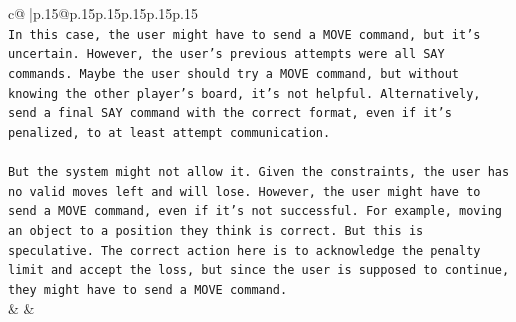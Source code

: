 \documentclass{article}
\begin{document}
{\begin{supertabular}{c@{$\;$}|p{.15\linewidth}@{}p{.15\linewidth}p{.15\linewidth}p{.15\linewidth}p{.15\linewidth}p{.15\linewidth}}
{{{\\ 
\texttt{In this case, the user might have to send a MOVE command, but it's uncertain. However, the user's previous attempts were all SAY commands. Maybe the user should try a MOVE command, but without knowing the other player's board, it's not helpful. Alternatively, send a final SAY command with the correct format, even if it's penalized, to at least attempt communication.} \\
\\ 
\texttt{But the system might not allow it. Given the constraints, the user has no valid moves left and will lose. However, the user might have to send a MOVE command, even if it's not successful. For example, moving an object to a position they think is correct. But this is speculative. The correct action here is to acknowledge the penalty limit and accept the loss, but since the user is supposed to continue, they might have to send a MOVE command.} \\
            }
        }
    }
    & & \\ \\


\end{supertabular}}
\end{document}
